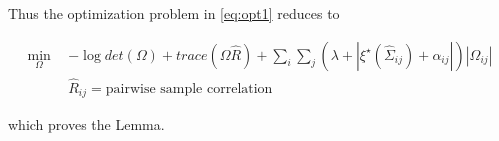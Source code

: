 Thus the optimization problem in \ref{eq:opt1} reduces to 

\begin{equation}\label{eq:opt2supp}
    \begin{aligned}
    \min_{\Omega} ~~ & - \log det \left ( \Omega \right ) + trace (\Omega \hat{R}) +  \sum_{i}\sum_{j} (\lambda + |\xi^{\star}(\hat{\Sigma}_{ij}) + \alpha_{ij}|)|\Omega_{ij}|  \\
     & \hat{R}_{ij}= \text{pairwise sample correlation}
    \end{aligned}
\end{equation}

which proves the Lemma. 

\newpage 
\newpage
\clearpage

